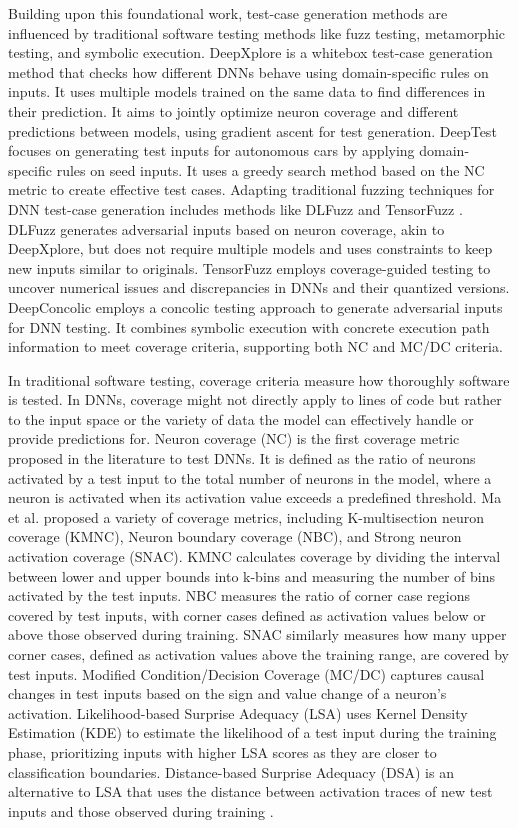 Building upon this foundational work, test-case generation methods are influenced by traditional software testing methods like fuzz testing, metamorphic testing, and symbolic execution. DeepXplore \cite{deepxplore} is a whitebox test-case generation method that checks how different DNNs behave using domain-specific rules on inputs. It uses multiple models trained on the same data to find differences in their prediction. It aims to jointly optimize neuron coverage and different predictions between models, using gradient ascent for test generation. DeepTest \cite{deeptest} focuses on generating test inputs for autonomous cars by applying domain-specific rules on seed inputs. It uses a greedy search method based on the NC metric to create effective test cases. Adapting traditional fuzzing techniques for DNN test-case generation includes methods like DLFuzz \cite{DLFuzz} and TensorFuzz \cite{tensorfuzz}. DLFuzz generates adversarial inputs based on neuron coverage, akin to DeepXplore, but does not require multiple models and uses constraints to keep new inputs similar to originals. TensorFuzz employs coverage-guided testing to uncover numerical issues and discrepancies in DNNs and their quantized versions. DeepConcolic \cite{Deepconcolic} employs a concolic testing approach to generate adversarial inputs for DNN testing. It combines symbolic execution with concrete execution path information to meet coverage criteria, supporting both NC and MC/DC criteria.

In traditional software testing, coverage criteria measure how thoroughly software is tested. In DNNs, coverage might not directly apply to lines of code but rather to the input space or the variety of data the model can effectively handle or provide predictions for. Neuron coverage (NC) \cite{deepxplore} is the first coverage metric proposed in the literature to test DNNs. It is defined as the ratio of neurons activated by a test input to the total number of neurons in the model, where a neuron is activated when its activation value exceeds a predefined threshold. Ma et al. \cite{Ma} proposed a variety of coverage metrics, including K-multisection neuron coverage (KMNC), Neuron boundary coverage (NBC), and Strong neuron activation coverage (SNAC). KMNC calculates coverage by dividing the interval between lower and upper bounds into k-bins and measuring the number of bins activated by the test inputs. NBC measures the ratio of corner case regions covered by test inputs, with corner cases defined as activation values below or above those observed during training. SNAC similarly measures how many upper corner cases, defined as activation values above the training range, are covered by test inputs. Modified Condition/Decision Coverage (MC/DC) \cite{SunY} captures causal changes in test inputs based on the sign and value change of a neuron's activation. Likelihood-based Surprise Adequacy (LSA) uses Kernel Density Estimation (KDE) to estimate the likelihood of a test input during the training phase, prioritizing inputs with higher LSA scores as they are closer to classification boundaries. Distance-based Surprise Adequacy (DSA) is an alternative to LSA that uses the distance between activation traces of new test inputs and those observed during training \cite{Kim}.

